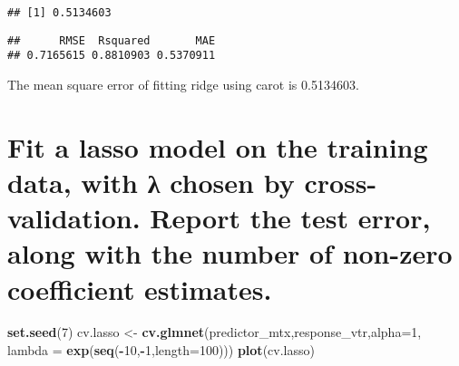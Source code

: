 \documentclass[]{article}
\newenvironment{Shaded}{\begin{snugshade}}{\end{snugshade}}
\newcommand{\DataTypeTok}[1]{\textcolor[rgb]{0.13,0.29,0.53}{#1}}
\newcommand{\DecValTok}[1]{\textcolor[rgb]{0.00,0.00,0.81}{#1}}
\newcommand{\KeywordTok}[1]{\textcolor[rgb]{0.13,0.29,0.53}{\textbf{#1}}}
\newcommand{\NormalTok}[1]{#1}
\newcommand{\OperatorTok}[1]{\textcolor[rgb]{0.81,0.36,0.00}{\textbf{#1}}}
\newcommand{\StringTok}[1]{\textcolor[rgb]{0.31,0.60,0.02}{#1}}
\begin{document}
\begin{Shaded}
\end{Shaded}

\begin{verbatim}
## [1] 0.5134603
\end{verbatim}

\begin{Shaded}
\end{Shaded}

\begin{verbatim}
##      RMSE  Rsquared       MAE 
## 0.7165615 0.8810903 0.5370911
\end{verbatim}

The mean square error of fitting ridge using carot is 0.5134603.

\hypertarget{fit-a-lasso-model-on-the-training-data-with--chosen-by-cross-validation.-report-the-test-error-along-with-the-number-of-non-zero-coefficient-estimates.}{%
\section{Fit a lasso model on the training data, with λ chosen by
cross-validation. Report the test error, along with the number of
non-zero coefficient
estimates.}\label{fit-a-lasso-model-on-the-training-data-with--chosen-by-cross-validation.-report-the-test-error-along-with-the-number-of-non-zero-coefficient-estimates.}}

\begin{Shaded}
\begin{Highlighting}[]
\KeywordTok{set.seed}\NormalTok{(}\DecValTok{7}\NormalTok{)}
\NormalTok{cv.lasso <-}\StringTok{ }\KeywordTok{cv.glmnet}\NormalTok{(predictor_mtx,response_vtr,}\DataTypeTok{alpha=}\DecValTok{1}\NormalTok{,}
                      \DataTypeTok{lambda =} \KeywordTok{exp}\NormalTok{(}\KeywordTok{seq}\NormalTok{(}\OperatorTok{-}\DecValTok{10}\NormalTok{,}\OperatorTok{-}\DecValTok{1}\NormalTok{,}\DataTypeTok{length=}\DecValTok{100}\NormalTok{)))}
\KeywordTok{plot}\NormalTok{(cv.lasso)}
\end{Highlighting}
\end{Shaded}
\end{document}
